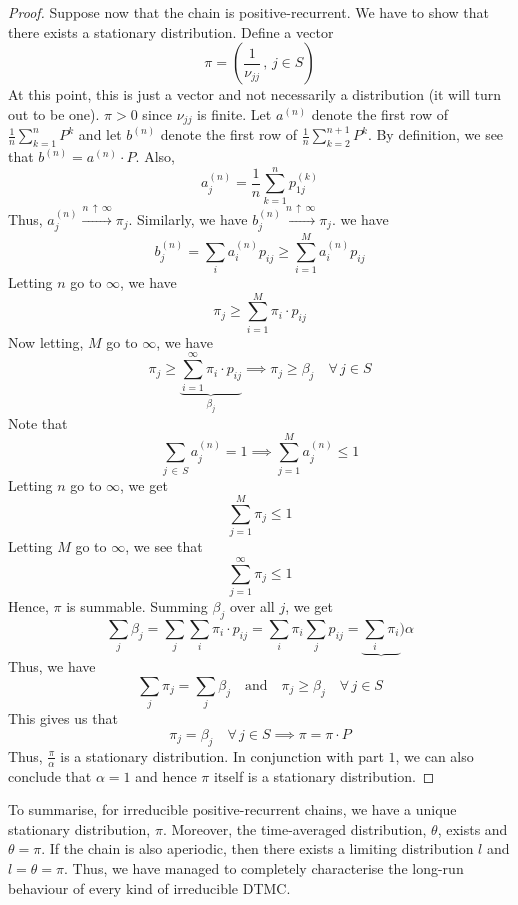 \documentclass[12pt]{article}
\theoremstyle{definition}
\begin{document}
\begin{proof}
    Suppose now that the chain is positive-recurrent. We have to show that there exists a stationary distribution. Define a vector
    \[
        \pi = \left( \frac{1}{\nu_{jj}} \, , \, j \in S \right)
    \]
    At this point, this is just a vector and not necessarily a distribution (it will turn out to be one). $\pi > 0$ since $\nu_{jj}$ is finite. Let $a^{(n)}$ denote the first row of $\frac{1}{n} \sum_{k=1}^n P^k$ and let $b^{(n)}$ denote the first row of $\frac{1}{n} \sum_{k=2}^{n+1} P^k$. By definition, we see that $b^{(n)} = a^{(n)} \cdot P$. Also, 
    \[
        a_j^{(n)} = \frac{1}{n} \sum_{k=1}^{n} p_{1j}^{(k)}
    \]
    Thus, $a^{(n)}_j \xrightarrow[]{n \, \uparrow \, \infty} \pi_j$. Similarly, we have $b^{(n)}_j \xrightarrow[]{n \, \uparrow \, \infty} \pi_j$. we have
    \[
        b_j^{(n)} = \sum_i a_i^{(n)} p_{ij} \geq \sum_{i=1}^M a_i^{(n)} p_{ij}
    \]
    Letting $n$ go to $\infty$, we have
    \[
        \pi_j \geq \sum_{i=1}^M \pi_i \cdot p_{ij}
    \]
    Now letting, $M$ go to $\infty$, we have
    \[
        \pi_j \geq \underbrace{\sum_{i=1}^{\infty} \pi_i \cdot p_{ij}}_{\beta_j} \implies \pi_j \geq \beta_j \quad \forall \, j \in S
    \]
    Note that
    \[
        \sum_{j \, \in \, S} a_j^{(n)} = 1 \implies \sum_{j=1}^M a_j^{(n)} \leq 1
    \]
    Letting $n$ go to $\infty$, we get
    \[
        \sum_{j=1}^M \pi_j \leq 1
    \]
    Letting $M$ go to $\infty$, we see that
    \[
        \sum_{j=1}^{\infty} \pi_j \leq 1
    \]
    Hence, $\pi$ is summable. Summing $\beta_j$ over all $j$, we get
    \[
        \sum_{j} \beta_j = \sum_j \sum_i \pi_i \cdot p_{ij} = \sum_i \pi_i \sum_j p_{ij} = \underbrace{\sum_i \pi_i}){\alpha}
    \]
    Thus, we have
    \[
        \sum_j \pi_j = \sum_j \beta_j \quad \text{and} \quad \pi_j \geq \beta_j \quad \forall \, j \in S
    \]
    This gives us that
    \[
        \pi_j = \beta_j \quad \forall \, j \in S \implies \pi = \pi \cdot P
    \]
    Thus, $\frac{\pi}{\alpha}$ is a stationary distribution. In conjunction with part $1$, we can also conclude that $\alpha = 1$ and hence $\pi$ itself is a stationary distribution.
\end{proof}

To summarise, for irreducible positive-recurrent chains, we have a unique stationary distribution, $\pi$. Moreover, the time-averaged distribution, $\theta$, exists and $\theta = \pi$. If the chain is also aperiodic, then there exists a limiting distribution $l$ and $l = \theta = \pi$. Thus, we have managed to completely characterise the long-run behaviour of every kind of irreducible DTMC. 
\end{document}

